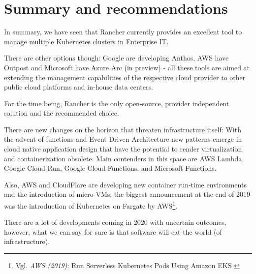 %
%

\pagebreak
\section{Summary and recommendations}

\onehalfspacing

In summary, we have seen that Rancher currently provides an excellent tool to manage multiple Kubernetes clusters in Enterprise IT.

There are other options though: Google are developing Anthos, AWS have Outpost and Microsoft have Azure Arc (in preview) - all these tools are aimed at extending the management capabilities of the respective cloud provider to other public cloud platforms and in-house data centers.

For the time being, Rancher is the only open-source, provider independent solution and the recommended choice.

There are new changes on the horizon that threaten infrastructure itself: With the advent of functions and Event Driven Architecture new patterns emerge in cloud native application design that have the potential to render virtualization and containerization obsolete. Main contenders in this space are AWS Lambda, Google Cloud Run, Google Cloud Functions, and Microsoft Functions.

Also, AWS and CloudFlare are developing new container run-time environments and the introduction of micro-VMs; the biggest announcement at the end of 2019 was the introduction of Kubernetes on Fargate by AWS\footnote{Vgl. \textit{AWS (2019)}: Run Serverless Kubernetes Pods Using Amazon EKS \cite{eksFargate}}.

There are a lot of developments coming in 2020 with uncertain outcomes, however, what we can say for sure is that software will eat the world (of infrastructure).
